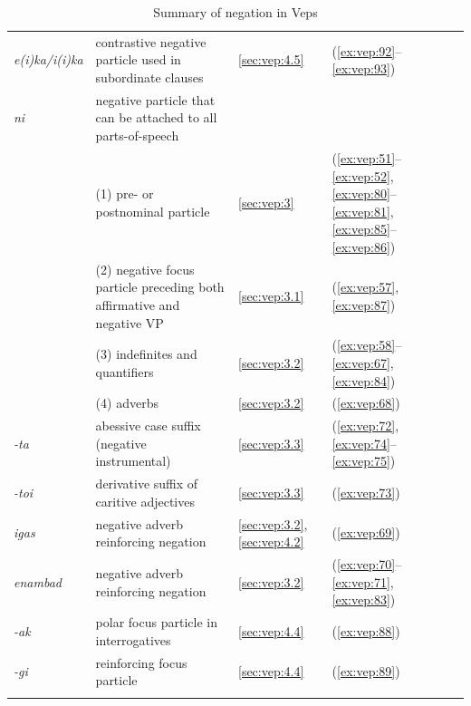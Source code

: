 \documentclass[output=paper,colorlinks=true, citecolor=brown]{langscibook}
\begin{document}
\begin{table}
\begin{tabularx}{\textwidth}{lQlp{25mm}}
\textit{e(i)ka/i(i)ka } 
& contrastive negative particle used in subordinate clauses 
& \ref{sec:vep:4.5}
& (\ref{ex:vep:92}--\ref{ex:vep:93})  \\


\textit{ni }
& negative particle that can be attached to all parts-of-speech &&\\

& (1) pre- or postnominal particle 
& \ref{sec:vep:3}
& (\ref{ex:vep:51}--\ref{ex:vep:52}, \ref{ex:vep:80}--\ref{ex:vep:81}, \ref{ex:vep:85}--\ref{ex:vep:86})  \\

& (2) negative focus particle preceding both affirmative and negative VP 
& \ref{sec:vep:3.1}
& (\ref{ex:vep:57}, \ref{ex:vep:87})  \\

& (3) indefinites and quantifiers 
& \ref{sec:vep:3.2}
& (\ref{ex:vep:58}--\ref{ex:vep:67}, \ref{ex:vep:84})  \\

& (4) adverbs 
& \ref{sec:vep:3.2}
& (\ref{ex:vep:68})  \\

\textit{-ta} 
& abessive case suffix (negative instrumental) 
& \ref{sec:vep:3.3}
& (\ref{ex:vep:72}, \ref{ex:vep:74}--\ref{ex:vep:75})  \\

\textit{-toi} 
& derivative suffix of caritive adjectives 
& \ref{sec:vep:3.3}
& (\ref{ex:vep:73})  \\


\textit{igas} 
& negative adverb reinforcing negation 
& \ref{sec:vep:3.2}, \ref{sec:vep:4.2}
& (\ref{ex:vep:69})  \\

\textit{enambad} 
& negative adverb reinforcing negation 
& \ref{sec:vep:3.2}
& (\ref{ex:vep:70}--\ref{ex:vep:71}, \ref{ex:vep:83})  \\


\textit{-ak} 
& polar focus particle in interrogatives 
& \ref{sec:vep:4.4}
& (\ref{ex:vep:88})  \\

\textit{-gi}
& reinforcing focus particle 
& \ref{sec:vep:4.4}
& (\ref{ex:vep:89})  \\
\lspbottomrule
    \end{tabularx}
    \caption{Summary of negation in Veps}
    \label{tab:vep:summary}
\end{table}
\end{document}
